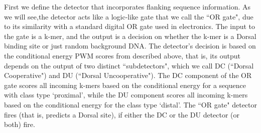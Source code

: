 First we define the detector that incorporates flanking sequence information.  As we will see,the detector acts like a logic-like gate that we call the ``OR gate", due to its similarity with a standard digital OR gate used in electronics.  The input to the gate is a k-mer, and the output is a decision on whether the k-mer is a Dorsal binding site or just random background DNA.  The detector's decision is based on the conditional energy PWM scores from  described above, that is, its output depends on the output of two distinct ``subdetectors", which we call DC (``Dorsal Cooperative") and DU (``Dorsal Uncooperative").  The DC component of the OR gate scores all incoming k-mers based on the conditional energy for a sequence with class type `proximal', while the DU component scores all incoming k-mers based on the conditional energy for the class type `distal'. The ``OR gate" detector fires (that is, predicts a Dorsal site), if either the DC or the DU detector (or both) fire. 
